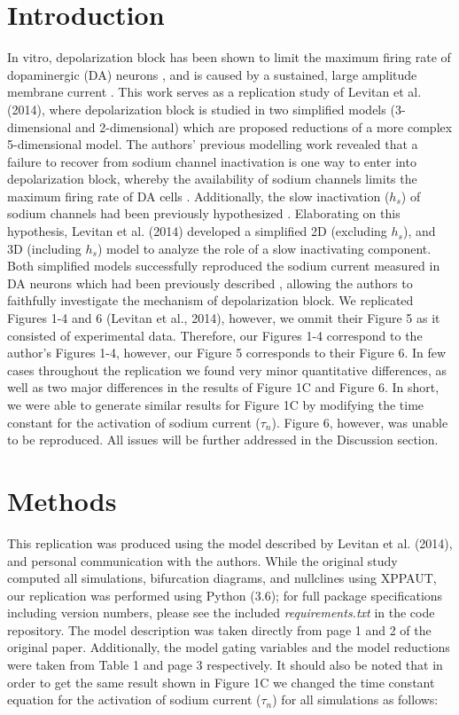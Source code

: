 \section{Introduction}

In vitro, depolarization block has been shown to limit the maximum firing rate of dopaminergic (DA) neurons \supercite{Richards1997}, and is caused by a sustained, large amplitude membrane current \supercite{Bianchi2012}. This work serves as a replication study of Levitan et al. (2014), where depolarization block is studied in two simplified models (3-dimensional and 2-dimensional) which are proposed reductions of a more complex 5-dimensional model. The authors’ previous modelling work revealed that a failure to recover from sodium channel inactivation is one way to enter into depolarization block, whereby the availability of sodium channels limits the maximum firing rate of DA cells \supercite{Levitan2014}. Additionally, the slow inactivation ($h_{s}$) of sodium channels had been previously hypothesized \supercite{Ding2011}. Elaborating on this hypothesis, Levitan et al. (2014) developed a simplified 2D (excluding $h_{s}$), and 3D (including $h_{s}$) model to analyze the role of a slow inactivating component. Both simplified models successfully reproduced the sodium current measured in DA neurons which had been previously described \supercite{Seutin2010}, allowing the authors to faithfully investigate the mechanism of depolarization block. We replicated Figures 1-4 and 6 (Levitan et al., 2014), however, we ommit their Figure 5 as it consisted of experimental data. Therefore, our Figures 1-4 correspond to the author's Figures 1-4, however, our Figure 5 corresponds to their Figure 6. In few cases throughout the replication we found very minor quantitative differences, as well as two major differences in the results of Figure 1C and Figure 6. In short, we were able to generate similar results for Figure 1C by modifying the time constant for the activation of sodium current ($\tau_{n}$). Figure 6, however, was unable to be reproduced. All issues will be further addressed in the Discussion section. 

\section{Methods}

This replication was produced using the model described by Levitan et al. (2014), and personal communication with the authors. While the original study computed all simulations, bifurcation diagrams, and nullclines using XPPAUT, our replication was performed using Python (3.6); for full package specifications including version numbers, please see the included \emph{requirements.txt} in the code repository. The model description was taken directly from page 1 and 2 of the original paper. Additionally, the model gating variables and the model reductions were taken from Table 1 and page 3 respectively. It should also be noted that in order to get the same result shown in Figure 1C we changed the time constant equation for the activation of sodium current ($\tau_{n}$) for all simulations as follows:
 
